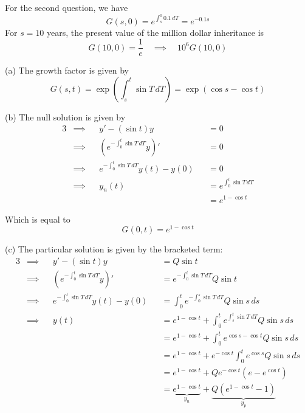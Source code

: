 \documentclass[a4paper]{article}
\begin{document}
For the second question, we have
\[
	G \!\left( s,0 \right) = e^{\int^{0}_{s} 0.1 \, dT } = e^{-0.1s}
\]
For \(s = 10\) years, the present value of the million dollar inheritance is
\[
	G \!\left( 10, 0 \right) = \frac{1}{e} \quad \implies \quad 10^{6} G \!\left( 10,0 \right) 
\]


(a) The growth factor is given by
\[
	G \!\left( s,t \right) = \exp\left( \int^{t}_{s} \sin T \, dT  \right) = \exp\left( \cos s - \cos t \right)
\]

(b) The null solution is given by
\begin{alignat*}{3}
	&\implies && y' - \!\left( \sin t \right) y && = 0 \\
	&\implies && \!\left( e^{-\int^{t}_{0} \sin T \, dT } y \right)' && = 0  \\
	&\implies && e^{-\int^{t}_{0} \sin T \, dT } y \!\left( t \right) - y \!\left( 0 \right) && = 0 \\
	&\implies && y_{n} \!\left( t \right) && = e^{\int^{t}_{0} \sin T \, dT } \\
	& && && = e^{1 - \cos t}
\end{alignat*}

Which is equal to
\[
	G \!\left( 0, t \right) = e^{1 - \cos t}
\]

(c) The particular solution is given by the bracketed term:
\begin{alignat*}{3}
	&\implies && y' - \!\left( \sin t \right) y && = Q \sin t \\
	&\implies && \!\left( e^{-\int^{t}_{0} \sin T \, dT }y \right)' && = e^{-\int^{t}_{0} \sin T \, dT } Q \sin t \\ 
	&\implies && e^{-\int^{t}_{0} \sin T \, dT } y \!\left( t \right) - y \!\left( 0 \right) && = \int^{t}_{0} e^{-\int^{s}_{0} \sin T \, dT } Q \sin s \, ds \\ 
	&\implies && y \!\left( t \right) && = e^{1 - \cos t} + \int^{t}_{0} e^{\int^{t}_{s} \sin T \, dT } Q \sin s \, ds \\
	& &&  && = e^{1 - \cos t} + \int^{t}_{0} e^{\cos s - \cos t} Q \sin s \, ds  \\
	& && && = e^{1 - \cos t} + e^{-\cos t} \int^{t}_{0} e^{\cos s} Q \sin s \, ds \\
	& && && = e^{1 - \cos t} + Qe^{-\cos t} \!\left( e - e^{\cos t} \right) \\
	& && && = \underbrace{e^{1 - \cos t}}_{y_{n}} + \underbrace{Q \!\left( e^{1 - \cos t} - 1 \right) }_{y_{p}}
\end{alignat*}
\end{document}
